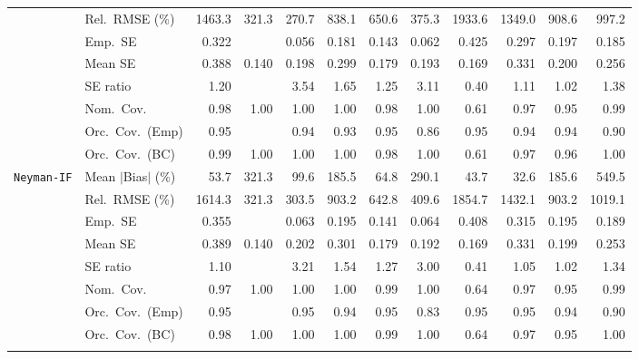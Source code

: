 \begin{landscape}
\begin{longtable}{llrrrrrrrrrr}
 & Rel.\ RMSE (\%) & 1463.3 & \cellcolor{ranktwo}321.3 & \cellcolor{rankone}270.7 & 838.1 & 650.6 & \cellcolor{rankthree}375.3 & 1933.6 & 1349.0 & 908.6 & 997.2 \\
 & Emp.\ SE & 0.322 &  & 0.056 & 0.181 & 0.143 & 0.062 & 0.425 & 0.297 & 0.197 & 0.185 \\
 & Mean SE & 0.388 & 0.140 & 0.198 & 0.299 & 0.179 & 0.193 & 0.169 & 0.331 & 0.200 & 0.256 \\
 & SE ratio & \cellcolor{rankthree}1.20 &  & 3.54 & 1.65 & 1.25 & 3.11 & 0.40 & \cellcolor{ranktwo}1.11 & \cellcolor{rankone}1.02 & 1.38 \\
 & Nom.\ Cov. & \cellcolor{rankthree}0.98 & 1.00 & 1.00 & 1.00 & 0.98 & 1.00 & 0.61 & \cellcolor{ranktwo}0.97 & \cellcolor{rankone}0.95 & 0.99 \\
 & Orc.\ Cov.\ (Emp) & \cellcolor{ranktwo}0.95 &  & 0.94 & 0.93 & \cellcolor{rankthree}0.95 & 0.86 & \cellcolor{rankone}0.95 & 0.94 & 0.94 & 0.90 \\
 & Orc.\ Cov.\ (BC) & 0.99 & 1.00 & 1.00 & 1.00 & \cellcolor{rankthree}0.98 & 1.00 & 0.61 & \cellcolor{ranktwo}0.97 & \cellcolor{rankone}0.96 & 1.00 \\
\addlinespace[2pt]
\quad \texttt{Neyman-IF} & Mean $|$Bias$|$ (\%) & \cellcolor{rankthree}53.7 & 321.3 & 99.6 & 185.5 & 64.8 & 290.1 & \cellcolor{ranktwo}43.7 & \cellcolor{rankone}32.6 & 185.6 & 549.5 \\
 & Rel.\ RMSE (\%) & 1614.3 & \cellcolor{ranktwo}321.3 & \cellcolor{rankone}303.5 & 903.2 & 642.8 & \cellcolor{rankthree}409.6 & 1854.7 & 1432.1 & 903.2 & 1019.1 \\
 & Emp.\ SE & 0.355 &  & 0.063 & 0.195 & 0.141 & 0.064 & 0.408 & 0.315 & 0.195 & 0.189 \\
 & Mean SE & 0.389 & 0.140 & 0.202 & 0.301 & 0.179 & 0.192 & 0.169 & 0.331 & 0.199 & 0.253 \\
 & SE ratio & \cellcolor{rankthree}1.10 &  & 3.21 & 1.54 & 1.27 & 3.00 & 0.41 & \cellcolor{ranktwo}1.05 & \cellcolor{rankone}1.02 & 1.34 \\
 & Nom.\ Cov. & \cellcolor{rankthree}0.97 & 1.00 & 1.00 & 1.00 & 0.99 & 1.00 & 0.64 & \cellcolor{ranktwo}0.97 & \cellcolor{rankone}0.95 & 0.99 \\
 & Orc.\ Cov.\ (Emp) & \cellcolor{rankone}0.95 &  & \cellcolor{rankthree}0.95 & 0.94 & \cellcolor{ranktwo}0.95 & 0.83 & 0.95 & 0.95 & 0.94 & 0.90 \\
 & Orc.\ Cov.\ (BC) & \cellcolor{rankthree}0.98 & 1.00 & 1.00 & 1.00 & 0.99 & 1.00 & 0.64 & \cellcolor{ranktwo}0.97 & \cellcolor{rankone}0.95 & 1.00 \\
\addlinespace[2pt]
\end{longtable}
\end{landscape}
